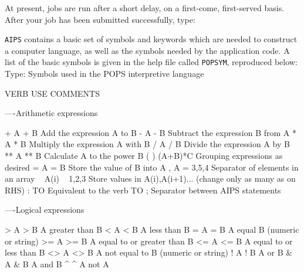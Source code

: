      At present,  jobs are run after a short delay, on a
first-come, first-served basis.  After your job has been submitted
successfully, type:


     {\tt AIPS} contains a basic set of symbols and keywords which are
needed to construct a computer language, as well as the symbols needed
by the application code.  A list of the basic symbols is given in the
help file called {\tt POPSYM}, reproduced below:
\bve
Type:  Symbols used in the POPS interpretive language

    VERB      USE        COMMENTS

                   ----Arithmetic expressions

     +       A + B       Add the expression A to B
     -       A - B       Subtract the expression B from A
     *       A * B       Multiply the expression A with B
     /       A / B       Divide the expression A by B
     **      A ** B      Calculate A to the power B
     ( )     (A+B)*C     Grouping expressions as desired
     =       A = B       Store the value of B into A
     ,       A = 3,5,4   Separator of elements in an array
     ~       A(i) ~ 1,2,3  Store values in A(i),A(i+1)...
                         (change only as many as on RHS)
     :       TO          Equivalent to the verb TO
     ;                   Separator between AIPS statements

                   ----Logical expressions

     >       A > B       A greater than B
     <       A < B       A less than B
     =       A = B       A equal B (numeric or string)
     >=      A >= B      A equal to or greater than B
     <=      A <= B      A equal to or less than B
     <>      A <> B      A not equal to B (numeric or string)
     !       A ! B       A or B
     &       A & B       A and B
     ^       ^ A         not A


